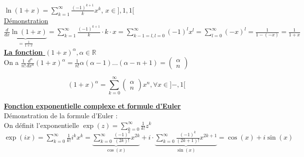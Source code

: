 \documentclass[12pt,a4paper]{article}
\newcommand{\somme}[2]{\ensuremath{\sum\limits_{#2}^{#1}}}
\newcommand{\evid}[1]{\textbf{\underline{#1}}}
\newcommand{\R}{\ensuremath{\mathbb{R}} }
\newcommand{\combi}[2]{\ensuremath{\begin{pmatrix} #1 \\ #2 \end{pmatrix}}}
\begin{document}
{$\ln(1+x) = \somme{\infty}{k=1}{\frac{(-1)^{k+1}}{k}x^k}$, $x\in ],1,1[$\\
\underline{Démonstration}\\
$\underbrace{\frac{d}{dx}\ln(1+x)}_{=\frac{1}{1+x}} = \somme{\infty}{k=1}{\frac{(-1)^{k+1}}{k}\cdot k\cdot x} =
 \somme{\infty}{k-1=l, l=0}{(-1)^lx^l} = \somme{\infty}{l=0}{(-x)^l}= \frac{1}{1-(-x)} = \frac{1}{1+x}$
\evid{La fonction $(1+x)^\alpha, \alpha\in\R$}\\
On a $\frac{1}{n!}\frac{d^n}{dx^n} (1+x)^\alpha = \frac{1}{n!}\alpha(\alpha-1)...(\alpha-n+1) = \combi{\alpha}{n}$
\begin{boite}
	\begin{equation}
		(1+x)^\alpha = \somme{\infty}{k=0}{\combi{\alpha}{n}x^n}, \forall x \in ]-,1[
	\end{equation}
\end{boite}
\evid{Fonction exponentielle complexe et formule d'Euler}\\
Démonstration de la formule d'Euler :\\
On définit l'exponentielle $\exp(z) = \somme{\infty}{k=0}{\frac{1}{k!}z^k}$\\
$\exp(ix)= \somme{\infty}{k=0}{\frac{1}{k!}i^kx^k} = \underbrace{\somme{\infty}{k=0}{\frac{(-1)^k}{(2k)!}x^{2k}}}_{\cos(x)} + i\cdot \underbrace{\somme{\infty}{k=0}{\frac{(-1)^k}{(2k+1)!}x^{2k+1}}}_{\sin(x)} = \cos(x) + i \sin(x)$
}
\end{document}
